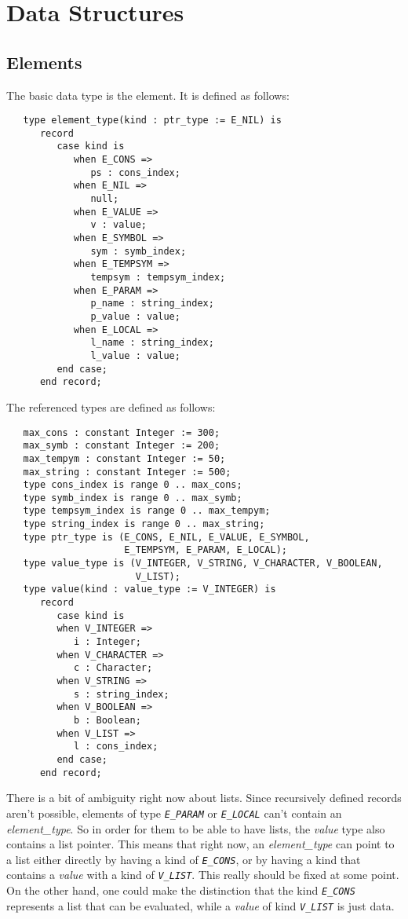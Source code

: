 \documentclass[10pt, openany]{book}
\newcommand{\constant}[1]{\emph{\texttt{#1}}}
\begin{document}
\section{Data Structures}
\subsection{Elements}
The basic data type is the element.  It is defined as follows:
\lstset{language=Ada}
\begin{lstlisting}
   type element_type(kind : ptr_type := E_NIL) is
      record
         case kind is
            when E_CONS =>
               ps : cons_index;
            when E_NIL =>
               null;
            when E_VALUE =>
               v : value;
            when E_SYMBOL =>
               sym : symb_index;
            when E_TEMPSYM =>
               tempsym : tempsym_index;
            when E_PARAM =>
               p_name : string_index;
               p_value : value;
            when E_LOCAL =>
               l_name : string_index;
               l_value : value;
         end case;
      end record;
\end{lstlisting}
The referenced types are defined as follows:
\begin{lstlisting}
   max_cons : constant Integer := 300;
   max_symb : constant Integer := 200;
   max_tempym : constant Integer := 50;
   max_string : constant Integer := 500;
   type cons_index is range 0 .. max_cons;
   type symb_index is range 0 .. max_symb;
   type tempsym_index is range 0 .. max_tempym;
   type string_index is range 0 .. max_string;
   type ptr_type is (E_CONS, E_NIL, E_VALUE, E_SYMBOL,
                     E_TEMPSYM, E_PARAM, E_LOCAL);
   type value_type is (V_INTEGER, V_STRING, V_CHARACTER, V_BOOLEAN,
                       V_LIST);
   type value(kind : value_type := V_INTEGER) is
      record
         case kind is
         when V_INTEGER =>
            i : Integer;
         when V_CHARACTER =>
            c : Character;
         when V_STRING =>
            s : string_index;
         when V_BOOLEAN =>
            b : Boolean;
         when V_LIST =>
            l : cons_index;
         end case;
      end record;
\end{lstlisting}

There is a bit of ambiguity right now about lists.  Since recursively defined records aren't possible, elements of type \constant{E\_PARAM} or \constant{E\_LOCAL} can't contain an \emph{element\_type}.  So in order for them to be able to have lists, the \emph{value} type also contains a list pointer.  This means that right now, an \emph{element\_type} can point to a list either directly by having a kind of \constant{E\_CONS}, or by having a kind that contains a \emph{value} with a kind of \constant{V\_LIST}.  This really should be fixed at some point.  On the other hand, one could make the distinction that the kind \constant{E\_CONS} represents a list that can be evaluated, while a \emph{value} of kind \constant{V\_LIST} is just data.
\end{document}
